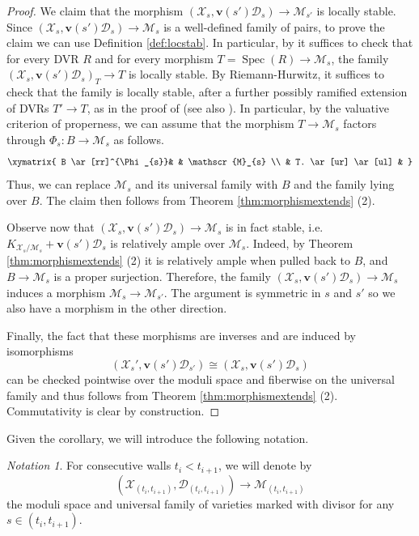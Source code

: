 \documentclass[11pt]{amsart}
\theoremstyle{definition}
\theoremstyle{remark}
\newtheorem{notation}[theorem]{Notation}
\newcommand{\calX}{\mathcal X}
\newcommand{\calD}{\mathcal D}
\newcommand{\sM}{\mathscr{M}}
\newcommand{\Spec}{\operatorname{Spec}}
\newcommand{\bfv}{\mathbf{v}}
\begin{document}
	\begin{proof} We claim that the morphism $(\calX_s,\mathbf{v}(s')\calD_s) \to \sM_{s'}$ is locally stable. Since $(\calX_s,\mathbf{v}(s')\calD_s) \to \sM_{s}$ is a well-defined family of pairs, to prove the claim we can use Definition \ref{def:locstab}. In particular, by \cite[Definition-Theorem 4.7]{kollarmodulibook} it suffices to check that for every DVR $R$ and for every morphism
		$T=\Spec(R) \to \sM_{s}$, the family $(\calX_s,\mathbf{v}(s')\calD_s)_T \to T$ is locally stable. 
		By Riemann-Hurwitz, it suffices to check that the family is locally stable, after a further possibly ramified extension of DVRs $T' \to T$, as in the proof of \cite[Proposition 2.10]{kollarmodulibook} (see also \cite[Section 11.23]{kollarmodulibook}). In particular,
		by the valuative criterion of properness, we can assume that the morphism $T \to \sM_{s}$ factors through $\Phi_{s}:B \to \sM_{s}$ as follows.
		$$\xymatrix{ B \ar[rr]^{\Phi_{s}}& & \sM_{s} \\
			& T. \ar[ur] \ar[ul] & }$$
		Thus, we can replace $\sM_{s}$ and its universal family with $B$ and the family lying over $B$.
		The claim then follows from Theorem \ref{thm:morphismextends} (2).
		
		Observe now that $(\calX_s,\mathbf{v}(s')\calD_s) \to \sM_{s}$ is in fact stable, i.e.  $K_{\calX_s/\sM_{s}}+\mathbf{v}(s')\calD_s$ is relatively ample over $\sM_{s}$. Indeed, by Theorem \ref{thm:morphismextends} (2) it is relatively ample when pulled back to $B$, and $B \to \sM_{s}$ is a proper surjection. Therefore, the family $(\calX_s,\mathbf{v}(s')\calD_s) \to \sM_{s}$ induces a morphism $\sM_{s} \to \sM_{s'}$. The argument is symmetric in $s$ and $s'$ so we also have a morphism in the other direction. 
		
		Finally, the fact that these morphisms are inverses and are induced by isomorphisms $$(\calX_s', \bfv(s')\calD_{s'}) \cong (\calX_s, \bfv(s')\calD_s)$$ can be checked pointwise over the moduli space and fiberwise on the universal family and thus follows from Theorem \ref{thm:morphismextends} (2). Commutativity is clear by construction.\end{proof}
	
	Given the corollary, we will introduce the following notation. 
	
	\begin{notation}\label{notation:chamber} For consecutive walls $t_i < t_{i+1}$, we will denote by $$(\calX_{(t_i, t_{i + 1})}, \calD_{(t_i, t_{i + 1})}) \to \sM_{(t_i,t_{i + 1})}$$ the moduli space and universal family of varieties marked with divisor for any $s \in (t_i, t_{i+1})$. 
	\end{notation}
	
\end{document}
